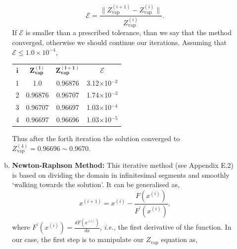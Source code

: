 \documentclass[12pts,a4paper,amsmath,amssymb,floatfix]{article}%
\newcommand{\frc}{\displaystyle\frac}
\newcommand{\ie}{{\it i.e., }}
\begin{document}
\begin{enumerate}[1)]
\begin{enumerate}[a)]
                 \begin{displaymath}
                      \mathcal{E} = \frc{\| Z_{\text{vap}}^{(i+1)} - Z_{\text{vap}}^{(i)}\|}{Z_{\text{vap}}^{(i)}}.
                 \end{displaymath}
                 If $\mathcal{E}$ is smaller than a prescribed tolerance, than we say that the method converged, otherwise we should continue our iterations. Assuming that $\mathcal{E} \leq 1.0\times 10^{-4}$,
                 \begin{center}
                     \begin{tabular}{c c c c}
                        \hline
                            $\mathbf{i}$  &  $\mathbf{Z_\text{vap}^{(i)}}$  & $\mathbf{Z_\text{vap}^{(i+1)}}$  & $\mathbf{\mathcal{E}}$ \\  
                               1         &           1.0                 &  0.96876                      &  3.12$\times$10$^{-2}$ \\
                               2         &       0.96876                 &  0.96707                      &  1.74$\times$10$^{-3}$ \\
                               3         &       0.96707                 &  0.96697                      &  1.03$\times$10$^{-4}$ \\
                               4         &       0.96697                 &  0.96696                      &  1.03$\times$10$^{-5}$ \\  
                        \hline
                     \end{tabular}
                 \end{center}
                 Thus after the forth iteration the solution converged to $Z_{\text{vap}}^{(4)} = 0.96696 \sim 0.9670$.
%
              \item {\bf Newton-Raphson Method:} This iterative method (see Appendix E.2) is based on dividing the domain in infinitesimal segments and smoothly `walking towards the solution'. It can be generalised as,
                  \begin{displaymath}
                     x^{(i+1)} = x^{(i)} - \frc{F\left(x^{(i)}\right)}{F^{\prime}\left(x^{(i)}\right)},
                  \end{displaymath}  
                  where $F^{\prime}\left(x^{(i)}\right) = \frc{d F\left(x^{(i)}\right)}{dx}$, \ie the first derivative of the function. In our case, the first step is to manipulate our $Z_{\text{vap}}$ equation as,
                  \begin{displaymath}

\end{displaymath}
\end{enumerate}
\end{enumerate}
\end{document}
